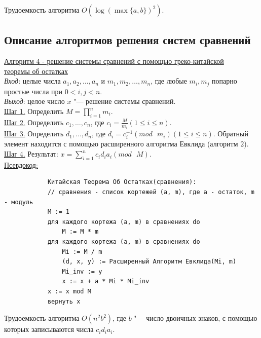 \documentclass[bachelor, och, labwork]{shiza}
\begin{document}
            Трудоемкость алгоритма $O(\log(\max\{a, b\})^2)$.\\
        
    \subsection{Описание  алгоритмов  решения систем сравнений}

        \underline{Алгоритм 4 - решение системы сравнений с помощью греко-китайской}\\
        \underline{теоремы об остатках}\\
            \textit{Вход}: целые числа $a_1, a_2, \dots, a_n$ и $m_1, m_2,
            \dots, m_n$, где любые $m_i, m_j$ попарно простые числа при $0 < i,
            j < n$.\\
            \textit{Выход}: целое число $x$ "--- решение системы сравнений.\\
            \underline{Шаг 1.} Определить $M = \prod_{i = 1}^{n} m_i$.\\
            \underline{Шаг 2.} Определить $c_1, \dots, c_n$, где $c_i =
            \frac{M}{m_i} (1 \leq i \leq n)$.\\
            \underline{Шаг 3.} Определить $d_1, \dots, d_n$, где $d_i = c^{-1}_i
            (mod \text{ } m_i) (1 \leq i \leq n)$. Обратный элемент находится с
            помощью расширенного алгоритма Евклида (алгоритм $2$).\\
            \underline{Шаг 4.} Результат: $x = \sum_{i = 1}^{n} c_i d_i a_i (mod \text{ } M)$.\\

            \underline{Псевдокод:}
            \begin{verbatim}
            Китайская Теорема Об Остатках(сравнения):
            // сравнения - список кортежей (a, m), где a - остаток, m - модуль
            M := 1
            для каждого кортежа (a, m) в сравнениях do
                M := M * m
            для каждого кортежа (a, m) в сравнениях do
                Mi := M / m
                (d, x, y) := Расширенный Алгоритм Евклида(Mi, m)
                Mi_inv := y
                x := x + a * Mi * Mi_inv
            x := x mod M
            вернуть x
            \end{verbatim}

            Трудоемкость алгоритма $O(n^2 b^2)$, где $b$ "--- число двоичных
            знаков, с помощью которых записываются числа $c_i d_i a_i$.\\
\end{document}
